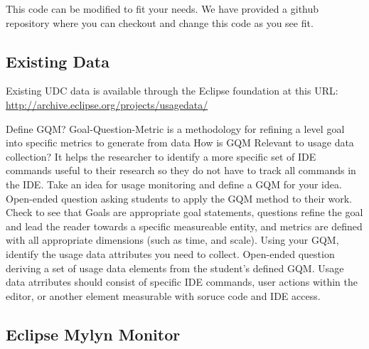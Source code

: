 This code can be modified to fit your needs.
We have provided a github repository where you can checkout 
and change this code as you see fit.



\subsection{Existing Data}

Existing UDC data is available through the Eclipse foundation at this URL:
\url{http://archive.eclipse.org/projects/usagedata/}

\begin{ExerciseList}
 \Exercise[type={long}, difficulty={0}]Define GQM?
  \Answer Goal-Question-Metric is a methodology for refining a level goal into specific metrics to generate from data
 \Exercise[ type={long}, difficulty={1}]How is GQM Relevant to usage data collection?
  \Answer It helps the researcher to identify a more specific set of IDE commands useful to their research so they do not have to track all commands in the IDE.
  \Exercise[ type={long}, difficulty={2}]Take an idea for usage monitoring and define a GQM for your idea.
  \Answer Open-ended question asking students to apply the GQM method to their work.  Check to see that Goals are appropriate goal statements, questions refine the goal and lead the reader towards a specific measureable entity, and metrics are defined with all appropriate dimensions (such as time, and scale).
  \Exercise[ type={long}, difficulty={2}]Using your GQM, identify the usage data attributes you need to collect.
  \Answer Open-ended question deriving a set of usage data elements from the student's defined GQM.  Usage data atrributes should consist of specific IDE commands, user actions within the editor, or another element measurable with soruce code and IDE access.

\end{ExerciseList}


\subsection{Eclipse Mylyn Monitor}
